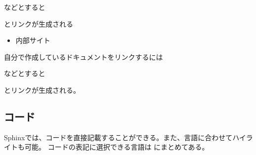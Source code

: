 \documentclass[letterpaper,10pt,dvipdfmx,report]{sphinxmanual}
\begin{document}
\begin{sphinxVerbatim}[commandchars=\\\{\}]
\end{sphinxVerbatim}

などとすると
\begin{quote}

\end{quote}

とリンクが生成される
\begin{itemize}
\item {} 
内部サイト

\end{itemize}

自分で作成しているドキュメントをリンクするには

\begin{sphinxVerbatim}[commandchars=\\\{\}]
\end{sphinxVerbatim}

などとすると
\begin{quote}

{\hyperref[\detokenize{index::doc}]{}}
\end{quote}

とリンクが生成される。


\subsection{コード}
\label{\detokenize{sphinx:id8}}
Sphinxでは、コードを直接記載することができる。また、言語に合わせてハイライトも可能。
コードの表記に選択できる言語は  にまとめてある。

\begin{sphinxVerbatim}[commandchars=\\\{\}]
  

      

      
      
        
\end{sphinxVerbatim}
\end{document}
